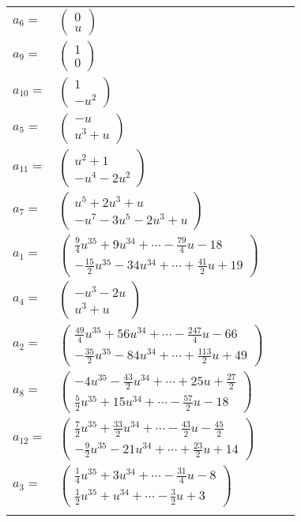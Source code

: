 \documentclass[1p]{elsarticle_modified}
\theoremstyle{definition}
\begin{document}
\begin{tabular}{m{7pt} m{180pt} m{7pt} m{180pt} }
\flushright $a_{6}=$&$\begin{pmatrix}0\\u\end{pmatrix}$ \\
\flushright $a_{9}=$&$\begin{pmatrix}1\\0\end{pmatrix}$ \\
\flushright $a_{10}=$&$\begin{pmatrix}1\\- u^2\end{pmatrix}$ \\
\flushright $a_{5}=$&$\begin{pmatrix}- u\\u^3+u\end{pmatrix}$ \\
\flushright $a_{11}=$&$\begin{pmatrix}u^2+1\\- u^4-2 u^2\end{pmatrix}$ \\
\flushright $a_{7}=$&$\begin{pmatrix}u^5+2 u^3+u\\- u^7-3 u^5-2 u^3+u\end{pmatrix}$ \\
\flushright $a_{1}=$&$\begin{pmatrix}\frac{9}{4} u^{35}+9 u^{34}+\cdots-\frac{79}{4} u-18\\-\frac{15}{2} u^{35}-34 u^{34}+\cdots+\frac{41}{2} u+19\end{pmatrix}$ \\
\flushright $a_{4}=$&$\begin{pmatrix}- u^3-2 u\\u^3+u\end{pmatrix}$ \\
\flushright $a_{2}=$&$\begin{pmatrix}\frac{49}{4} u^{35}+56 u^{34}+\cdots-\frac{247}{4} u-66\\-\frac{35}{2} u^{35}-84 u^{34}+\cdots+\frac{113}{2} u+49\end{pmatrix}$ \\
\flushright $a_{8}=$&$\begin{pmatrix}-4 u^{35}-\frac{43}{2} u^{34}+\cdots+25 u+\frac{27}{2}\\\frac{5}{2} u^{35}+15 u^{34}+\cdots-\frac{57}{2} u-18\end{pmatrix}$ \\
\flushright $a_{12}=$&$\begin{pmatrix}\frac{7}{2} u^{35}+\frac{33}{2} u^{34}+\cdots-\frac{43}{2} u-\frac{45}{2}\\-\frac{9}{2} u^{35}-21 u^{34}+\cdots+\frac{23}{2} u+14\end{pmatrix}$ \\
\flushright $a_{3}=$&$\begin{pmatrix}\frac{1}{4} u^{35}+3 u^{34}+\cdots-\frac{31}{4} u-8\\\frac{1}{2} u^{35}+u^{34}+\cdots-\frac{3}{2} u+3\end{pmatrix}$\\&\end{tabular}
\end{document}
